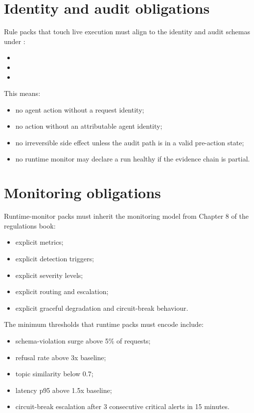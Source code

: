 \section{Identity and audit obligations}

Rule packs that touch live execution must align to the identity and
audit schemas under :
\begin{itemize}
  \item {}
  \item {}
  \item {}
\end{itemize}

This means:
\begin{itemize}
  \item no agent action without a request identity;
  \item no action without an attributable agent identity;
  \item no irreversible side effect unless the audit path is in a
    valid pre-action state;
  \item no runtime monitor may declare a run healthy if the evidence
    chain is partial.
\end{itemize}

\section{Monitoring obligations}

Runtime-monitor packs must inherit the monitoring model from Chapter 8
of the regulations book:
\begin{itemize}
  \item explicit metrics;
  \item explicit detection triggers;
  \item explicit severity levels;
  \item explicit routing and escalation;
  \item explicit graceful degradation and circuit-break behaviour.
\end{itemize}

The minimum thresholds that runtime packs must encode include:
\begin{itemize}
  \item schema-violation surge above 5\% of requests;
  \item refusal rate above 3x baseline;
  \item topic similarity below 0.7;
  \item latency p95 above 1.5x baseline;
  \item circuit-break escalation after 3 consecutive critical alerts in
    15 minutes.
\end{itemize}

